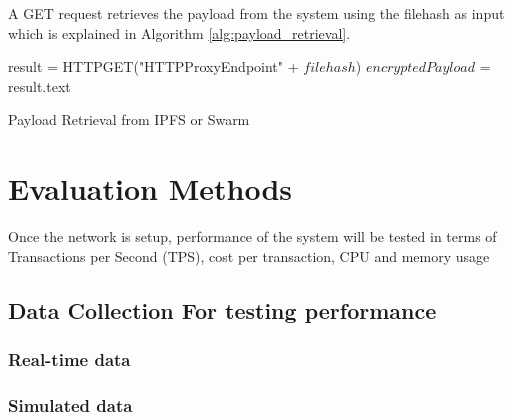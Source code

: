 \documentclass[11pt,openright]{report}
\begin{document}
A GET request retrieves the payload from the system using the filehash as input which is explained in Algorithm \ref{alg:payload_retrieval}.

\begin{algorithm}[getSwarmOrIPFSData]
  result = HTTPGET("HTTPProxyEndpoint" + $filehash$)\;
  $encryptedPayload$ = result.text\;
 \caption{Payload Retrieval from IPFS or Swarm}
 \label{alg:payload_retrieval}
\end{algorithm}



\section{Evaluation Methods}
Once the network is setup, performance of the system will be tested in terms of Transactions per Second (TPS), cost per transaction, CPU and memory usage

\subsection{Data Collection For testing performance}
\subsubsection{Real-time data}

\subsubsection{Simulated data}
\end{document}

